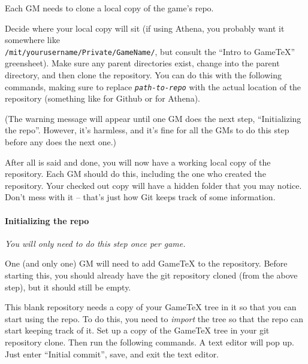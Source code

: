 \documentclass[green]{testgame}
\begin{document}
Each GM needs to clone a local copy of the game's repo.

Decide where your local copy will sit (if using Athena, you probably want it
somewhere like\\ {\tt /mit/yourusername/Private/GameName/}, but consult the
``Intro to GameTeX'' greensheet). Make sure any parent directories exist,
change into the parent directory, and then clone the repository. You can do
this with the following commands, making sure to replace
\texttt{\emph{path-to-repo}} with the actual location of the repository
(something like  for Github or
 for Athena).


(The warning message will appear until one GM does the next step, ``Initializing the repo''. However, it's harmless, and it's fine for all the GMs to do this step before any does the next one.)

After all is said and done, you will now have a working local copy of the
repository.  Each GM should do this, including the one who created the
repository. Your checked out copy will have a hidden  folder that
you may notice.  Don't mess with it -- that's just how Git keeps track of some
information.

\paragraph*{Initializing the repo} \emph{You will only need to do this step once per game.}

One (and only one) GM will need to add GameTeX to the repository. Before starting this, you should already have the git repository cloned (from the above step), but it should still be empty.

This blank repository needs a copy of your GameTeX tree in it so that you can
start using the repo. To do this, you need to \emph{import} the tree so that
the repo can start keeping track of it. Set up a copy of the GameTeX tree in
your git repository clone. Then run the following commands. A text editor will
pop up. Just enter ``Initial commit'', save, and exit the text editor.
\end{document}
